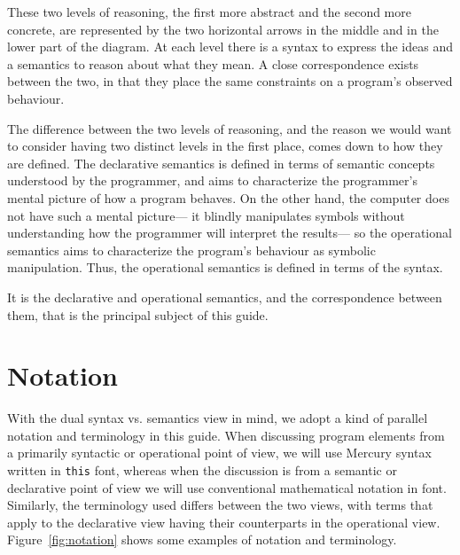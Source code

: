 These two levels of reasoning,
the first more abstract and the second more concrete,
are represented by the two horizontal arrows
in the middle and in the lower part of the diagram.
At each level there is a syntax to express the ideas
and a semantics to reason about what they mean.
A close correspondence exists between the two,
in that they place the same constraints
on a program's observed behaviour.

The difference between the two levels of reasoning,
and the reason we would want to consider
having two distinct levels in the first place,
comes down to how they are defined.
The declarative semantics is defined in terms of semantic concepts
understood by the programmer,
and aims to characterize the programmer's mental picture
of how a program behaves.
On the other hand,
the computer does not have such a mental picture---%
it blindly manipulates symbols
without understanding how the programmer will interpret the results---%
so the operational semantics aims to characterize
the program's behaviour as symbolic manipulation.
Thus, the operational semantics is defined
in terms of the syntax.

It is the declarative and operational semantics,
and the correspondence between them,
that is the principal subject of this guide.


\section{Notation}
\label{sec:notation}

With the dual syntax vs. semantics view in mind,
we adopt a kind of parallel notation and terminology in this guide.
When discussing program elements
from a primarily syntactic or operational point of view,
we will use Mercury syntax written in \verb#this# font,
whereas when the discussion is from a semantic or declarative point of view
we will use conventional mathematical notation in  font.
Similarly,
the terminology used differs between the two views,
with terms that apply to the declarative view
having their counterparts in the operational view.
Figure~\ref{fig:notation} shows some examples of notation and terminology.

